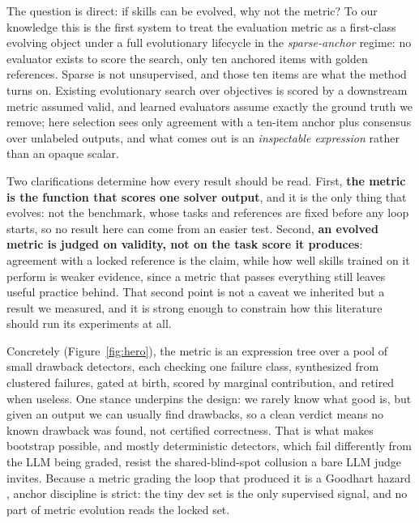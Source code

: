 \documentclass[letterpaper]{article} %
\begin{document}
The question is direct: if skills can be evolved, why not the metric? To our knowledge this is the first system to treat the evaluation metric as a first-class evolving object under a full evolutionary lifecycle in the \emph{sparse-anchor} regime: no evaluator exists to score the search, only ten anchored items with golden references. Sparse is not unsupervised, and those ten items are what the method turns on. Existing evolutionary search over objectives is scored by a downstream metric assumed valid, and learned evaluators assume exactly the ground truth we remove; here selection sees only agreement with a ten-item anchor plus consensus over unlabeled outputs, and what comes out is an \emph{inspectable expression} rather than an opaque scalar.

Two clarifications determine how every result should be read. First, \textbf{the metric is the function that scores one solver output}, and it is the only thing that evolves: not the benchmark, whose tasks and references are fixed before any loop starts, so no result here can come from an easier test. Second, \textbf{an evolved metric is judged on validity, not on the task score it produces}: agreement with a locked reference is the claim, while how well skills trained on it perform is weaker evidence, since a metric that passes everything still leaves useful practice behind. That second point is not a caveat we inherited but a result we measured, and it is strong enough to constrain how this literature should run its experiments at all.

Concretely (Figure~\ref{fig:hero}), the metric is an expression tree over a pool of small drawback detectors, each checking one failure class, synthesized from clustered failures, gated at birth, scored by marginal contribution, and retired when useless. One stance underpins the design: we rarely know what good is, but given an output we can usually find drawbacks, so a clean verdict means no known drawback was found, not certified correctness. That is what makes bootstrap possible, and mostly deterministic detectors, which fail differently from the LLM being graded, resist the shared-blind-spot collusion a bare LLM judge invites. Because a metric grading the loop that produced it is a Goodhart hazard \citep{goodhart1984problems,gao2023scaling}, anchor discipline is strict: the tiny dev set is the only supervised signal, and no part of metric evolution reads the locked set.
\end{document}

